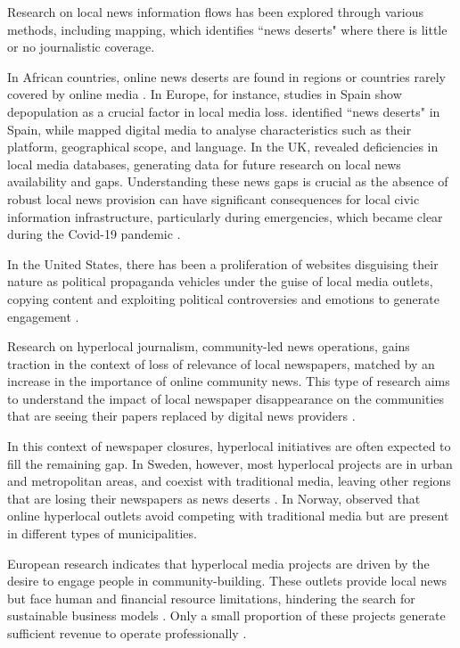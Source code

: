 \documentclass[english]{textolivre}
\begin{document}
Research on local news information flows has been explored through various methods, including mapping, which identifies ``news deserts" where there is little or no journalistic coverage.

In African countries, online news deserts are found in regions or countries rarely covered by online media \cite{madridmorales2023}. In Europe, for instance, studies in Spain show depopulation as a crucial factor in local media loss. \textcite{negreira-rey2023} identified ``news deserts" in Spain, while \textcite{negredo2023} mapped digital media to analyse characteristics such as their platform, geographical scope, and language. In the UK, \textcite{bisiani2023} revealed deficiencies in local media databases, generating data for future research on local news availability and gaps. Understanding these news gaps is crucial as the absence of robust local news provision can have significant consequences for local civic information infrastructure, particularly during emergencies, which became clear during the Covid-19 pandemic \cite{battocchio2023}.

In the United States, there has been a proliferation of websites disguising their nature as political propaganda vehicles under the guise of  local media outlets, copying content and exploiting political controversies and emotions to generate engagement \cite{karell2022}.

Research on hyperlocal journalism, community-led news operations, gains traction in the context of loss of relevance of local newspapers, matched by an increase in the importance of online community news. This type of research aims to understand the impact of local newspaper disappearance on the communities that are seeing their papers replaced by digital news providers \cite{harte2018}.

In this context of newspaper closures, hyperlocal initiatives are often expected to fill the remaining gap. In Sweden, however, most hyperlocal projects are in urban and metropolitan areas, and coexist with traditional media, leaving other regions that are losing their newspapers as news deserts \cite{jangdal2019, nygren2018}. In Norway, \textcite{halvorsen2019} observed that online hyperlocal outlets avoid competing with traditional media but are present in different types of municipalities.

European research indicates that hyperlocal media projects are driven by the desire to engage people in community-building. These outlets provide local news but face human and financial resource limitations, hindering the search for sustainable business models \cite{hujanen2019, negreira-rey2022, tenor2019}. Only a small proportion of these projects generate sufficient revenue to operate professionally \cite{halvorsen2019}.
\end{document}
